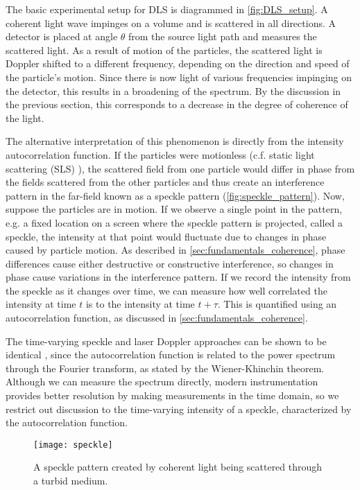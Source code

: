 The basic experimental setup for DLS is diagrammed in \autoref{fig:DLS_setup}. A coherent light wave impinges on a volume and is scattered in all directions. A detector is placed at angle $\theta$ from the source light path and measures the scattered light. As a result of motion of the particles, the scattered light is Doppler shifted to a different frequency, depending on the direction and speed of the particle's motion. Since there is now light of various frequencies impinging on the detector, this results in a broadening of the spectrum. By the discussion in the previous section, this corresponds to a decrease in the degree of coherence of the light. 

The alternative interpretation of this phenomenon is directly from the intensity autocorrelation function. If the particles were motionless (c.f. static light scattering (SLS) \cite{Malvern2013}), the scattered field from one particle would differ in phase from the fields scattered from the other particles and thus create an interference pattern in the far-field known as a speckle pattern (\autoref{fig:speckle_pattern}). Now, suppose the particles are in motion. If we observe a single point in the pattern, e.g. a fixed location on a screen where the speckle pattern is projected, called a speckle, the intensity at that point would fluctuate due to changes in phase caused by particle motion. As described in \autoref{sec:fundamentals_coherence}, phase differences cause either destructive or constructive interference, so changes in phase cause variations in the interference pattern. If we record the intensity from the speckle as it changes over time, we can measure how well correlated the intensity at time $t$ is to the intensity at time $t+\tau$. This is quantified using an autocorrelation function, as discussed in \autoref{sec:fundamentals_coherence}. 

The time-varying speckle and laser Doppler approaches can be shown to be identical \cite{Briers2001}, since the autocorrelation function is related to the power spectrum through the Fourier transform, as stated by the Wiener-Khinchin theorem. Although we can measure the spectrum directly, modern instrumentation provides better resolution by making measurements in the time domain, so we restrict out discussion to the time-varying intensity of a speckle, characterized by the autocorrelation function.

\begin{figure}[tb]
    \centering
    \texttt{[image: speckle]}
    \caption{A speckle pattern created by coherent light being scattered through a turbid medium.}
    \label{fig:speckle_pattern}
\end{figure}

